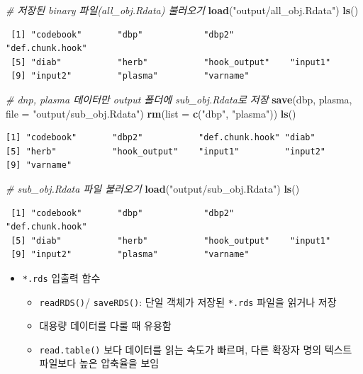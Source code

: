 \documentclass[
  11pt,
]{krantz}
\newenvironment{Shaded}{\begin{snugshade}}{\end{snugshade}}
\newcommand{\CommentTok}[1]{\textcolor[rgb]{0.37,0.37,0.37}{\textit{#1}}}
\newcommand{\DataTypeTok}[1]{\textcolor[rgb]{0.27,0.27,0.27}{#1}}
\newcommand{\KeywordTok}[1]{\textcolor[rgb]{0.27,0.27,0.27}{\textbf{#1}}}
\newcommand{\NormalTok}[1]{#1}
\newcommand{\StringTok}[1]{\textcolor[rgb]{0.5,0.5,0.5}{#1}}
\providecommand{\tightlist}{%
  \setlength{\itemsep}{0pt}\setlength{\parskip}{0pt}}
\begin{document}
\begin{Shaded}
\begin{Highlighting}[]
\CommentTok{# 저장된 binary 파일(all_obj.Rdata) 불러오기}
\KeywordTok{load}\NormalTok{(}\StringTok{"output/all_obj.Rdata"}\NormalTok{)}
\KeywordTok{ls}\NormalTok{()}
\end{Highlighting}
\end{Shaded}

\begin{verbatim}
 [1] "codebook"       "dbp"            "dbp2"           "def.chunk.hook"
 [5] "diab"           "herb"           "hook_output"    "input1"        
 [9] "input2"         "plasma"         "varname"       
\end{verbatim}

\begin{Shaded}
\begin{Highlighting}[]
\CommentTok{# dnp, plasma 데이터만 output 폴더에 sub_obj.Rdata로 저장}
\KeywordTok{save}\NormalTok{(dbp, plasma, }\DataTypeTok{file =} \StringTok{"output/sub_obj.Rdata"}\NormalTok{)}
\KeywordTok{rm}\NormalTok{(}\DataTypeTok{list =} \KeywordTok{c}\NormalTok{(}\StringTok{"dbp"}\NormalTok{, }\StringTok{"plasma"}\NormalTok{))}
\KeywordTok{ls}\NormalTok{()}
\end{Highlighting}
\end{Shaded}

\begin{verbatim}
[1] "codebook"       "dbp2"           "def.chunk.hook" "diab"          
[5] "herb"           "hook_output"    "input1"         "input2"        
[9] "varname"       
\end{verbatim}

\begin{Shaded}
\begin{Highlighting}[]
\CommentTok{# sub_obj.Rdata 파일 불러오기}
\KeywordTok{load}\NormalTok{(}\StringTok{"output/sub_obj.Rdata"}\NormalTok{)}
\KeywordTok{ls}\NormalTok{()}
\end{Highlighting}
\end{Shaded}

\begin{verbatim}
 [1] "codebook"       "dbp"            "dbp2"           "def.chunk.hook"
 [5] "diab"           "herb"           "hook_output"    "input1"        
 [9] "input2"         "plasma"         "varname"       
\end{verbatim}

\normalsize

\begin{itemize}
\tightlist
\item
  \texttt{*.rds} 입출력 함수

  \begin{itemize}
  \tightlist
  \item
    \texttt{readRDS()}/ \texttt{saveRDS()}: 단일 객체가 저장된 \texttt{*.rds} 파일을 읽거나 저장
  \item
    대용량 데이터를 다룰 때 유용함
  \item
    \texttt{read.table()} 보다 데이터를 읽는 속도가 빠르며, 다른 확장자 명의 텍스트 파일보다 높은 압축율을 보임
  \end{itemize}
\end{itemize}
\end{document}

